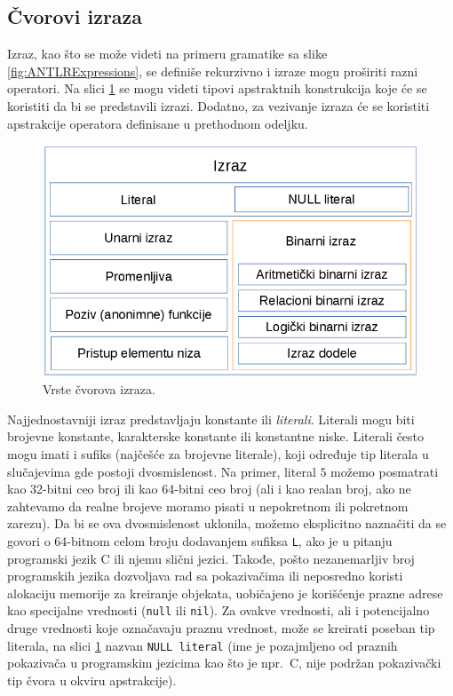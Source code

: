 \subsection{Čvorovi izraza}
\label{subsec:MyASTExpressionNodes}

Izraz, kao što se može videti na primeru gramatike sa slike \ref{fig:ANTLRExpressions}, se definiše rekurzivno i izraze mogu proširiti razni operatori. Na slici \ref{fig:ExpressionNodes} se mogu videti tipovi apstraktnih konstrukcija koje će se koristiti da bi se predstavili izrazi. Dodatno, za vezivanje izraza će se koristiti apstrakcije operatora definisane u prethodnom odeljku.

\begin{figure}[h!]
\centering
\includegraphics[scale=0.5]{images/expression_nodes.png}
\caption{Vrste čvorova izraza.}
\label{fig:ExpressionNodes}
\end{figure}

Najjednostavniji izraz predstavljaju konstante ili \emph{literali}. Literali mogu biti brojevne konstante, karakterske konstante ili konstantne niske. Literali često mogu imati i sufiks (najčešće za brojevne literale), koji određuje tip literala u slučajevima gde postoji dvosmislenost. Na primer, literal $5$ možemo posmatrati kao 32-bitni ceo broj ili kao 64-bitni ceo broj (ali i kao realan broj, ako ne zahtevamo da realne brojeve moramo pisati u nepokretnom ili pokretnom zarezu). Da bi se ova dvosmislenost uklonila, možemo eksplicitno naznačiti da se govori o 64-bitnom celom broju dodavanjem sufiksa \texttt{L}, ako je u pitanju programski jezik C ili njemu slični jezici. Takođe, pošto nezanemarljiv broj programskih jezika dozvoljava rad sa pokazivačima ili neposredno koristi alokaciju memorije za kreiranje objekata, uobičajeno je korišćenje prazne adrese kao specijalne vrednosti (\texttt{null} ili \texttt{nil}). Za ovakve vrednosti, ali i potencijalno druge vrednosti koje označavaju praznu vrednost, može se kreirati poseban tip literala, na slici \ref{fig:ExpressionNodes} nazvan \texttt{NULL literal} (ime je pozajmljeno od praznih pokazivača u programskim jezicima kao što je npr.~C, nije podržan pokazivački tip čvora u okviru apstrakcije).

